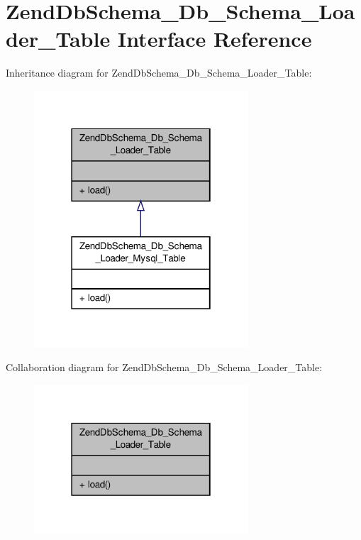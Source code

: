 \hypertarget{interfaceZendDbSchema__Db__Schema__Loader__Table}{\section{Zend\-Db\-Schema\-\_\-\-Db\-\_\-\-Schema\-\_\-\-Loader\-\_\-\-Table Interface Reference}
\label{interfaceZendDbSchema__Db__Schema__Loader__Table}
}


Inheritance diagram for Zend\-Db\-Schema\-\_\-\-Db\-\_\-\-Schema\-\_\-\-Loader\-\_\-\-Table\-:\nopagebreak
\begin{figure}[H]
\begin{center}
\leavevmode
\includegraphics[width=226pt]{interfaceZendDbSchema__Db__Schema__Loader__Table__inherit__graph}
\end{center}
\end{figure}


Collaboration diagram for Zend\-Db\-Schema\-\_\-\-Db\-\_\-\-Schema\-\_\-\-Loader\-\_\-\-Table\-:\nopagebreak
\begin{figure}[H]
\begin{center}
\leavevmode
\includegraphics[width=226pt]{interfaceZendDbSchema__Db__Schema__Loader__Table__coll__graph}
\end{center}
\end{figure}

